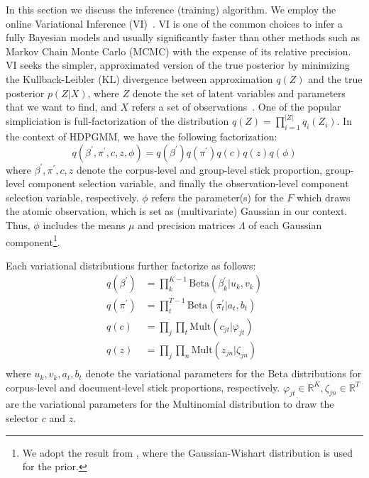 \documentclass{article}
\begin{document}
In this section we discuss the inference (training) algorithm. We employ the online Variational Inference (VI)~\cite{DBLP:journals/jmlr/WangPB11}. VI is one of the common choices to infer a fully Bayesian models and usually significantly faster than other methods such as Markov Chain Monte Carlo (MCMC) with the expense of its relative precision. VI seeks the simpler, approximated version of the true posterior by minimizing the Kullback-Leibler (KL) divergence between approximation $q(Z)$ and the true posterior $p(Z|X)$, where $Z$ denote the set of latent variables and parameters that we want to find, and $X$ refers a set of observations~\cite{DBLP:journals/jei/BishopN07}.
One of the popular simpliciation is full-factorization of the distribution $q(Z) = \prod^{|Z|}_{i=1} q_{i}(Z_{i})$. In the context of HDPGMM, we have the following factorization:
\begin{equation}\label{eq:meanfield_vi_hdpgmm}
    q(\beta^{\prime}, \pi^{\prime}, c, z, \phi) = q(\beta^{\prime})q(\pi^{\prime})q(c)q(z)q(\phi)
\end{equation}
where $\beta^{\prime}, \pi^{\prime}, c, z$ denote the corpus-level and group-level stick proportion, group-level component selection variable, and finally the observation-level component selection variable, respectively. $\phi$ refers the parameter(s) for the $F$ which draws the atomic observation, which is set as (multivariate) Gaussian in our context. Thus, $\phi$ includes the means $\mu$ and precision matrices $\Lambda$ of each Gaussian component\footnote{We adopt the result from \cite{DBLP:journals/jei/BishopN07}, where the Gaussian-Wishart distribution is used for the prior.}. 

Each variational distributions further factorize as follows:
\begin{equation}\label{eq:meanfield_further}
\begin{aligned}
    q(\beta^{\prime}) &= \textstyle \prod\nolimits_{k}^{K-1}\text{Beta}(\beta^{\prime}_{k}|u_{k}, v_{k}) \\
    q(\pi^{\prime}) &= \textstyle \prod\nolimits_{t}^{T-1}\text{Beta}(\pi^{\prime}_{t}|a_{t}, b_{t}) \\
    q(c) &= \textstyle \prod\nolimits_{j}\prod\nolimits_{t}\text{Mult}(c_{jt}|\varphi_{jt}) \\
    q(z) &= \textstyle \prod\nolimits_{j}\prod\nolimits_{n}\text{Mult}(z_{jn}|\zeta_{jn}) \\
\end{aligned}
\end{equation}
where $u_{k}, v_{k}, a_{t}, b_{t}$ denote the variational parameters for the Beta distributions for corpus-level and document-level stick proportions, respectively. $\varphi_{jt}\in\mathbb{R}^{K}, \zeta_{jn}\in\mathbb{R}^{T}$ are the variational parameters for the Multinomial distribution to draw the selector $c$ and $z$.
\end{document}
